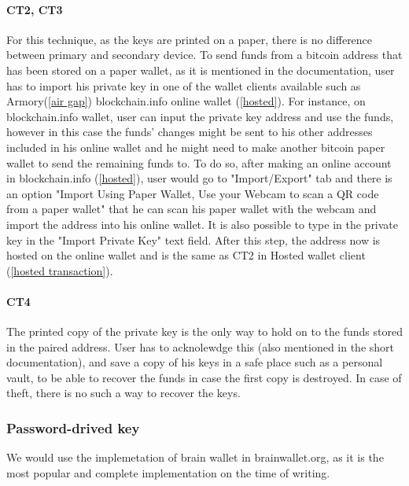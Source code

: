 \paragraph{CT2, CT3} For this technique, as the keys are printed on a paper, there is no difference between primary and secondary device.
To send funds from a bitcoin address that has been stored on a paper wallet, as it is mentioned in the documentation, user has to import his private key in one of the wallet clients available such as Armory(\ref{air gap}) blockchain.info online wallet (\ref{hosted}). For instance, on blockchain.info wallet, user can input the private key address and use the funds, however in this case the funds' changes might be sent to his other addresses included in his online wallet and he might need to make another bitcoin paper wallet to send the remaining funds to. To do so, after making an online account in blockchain.info (\ref{hosted}), user would go to "Import/Export" tab and there is an option "Import Using Paper Wallet, Use your Webcam to scan a QR code from a paper wallet" that he can scan his paper wallet with the webcam and import the address into his online wallet. It is also possible to type in the private key in the "Import Private Key" text field. After this step, the address now is hosted on the online wallet and is the same as CT2 in Hosted wallet client (\ref{hosted transaction}).

\paragraph{CT4} The printed copy of the private key is the only way to hold on to the funds stored in the paired address. User has to acknolewdge this (also mentioned in the short documentation), and save a copy of his keys in a safe place such as a personal vault, to be able to recover the funds in case the first copy is destroyed. In case of theft, there is no such a way to recover the keys.


\subsubsection{Password-drived key} We would use the implemetation of brain wallet in brainwallet.org, as it is the most popular and complete implementation on the time of writing.
